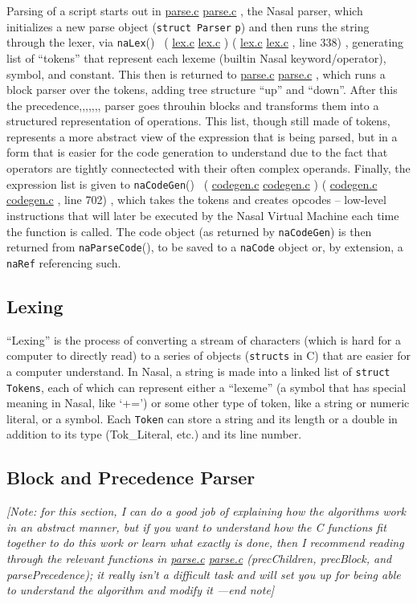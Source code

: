 \documentclass{article}
\newcommand{\todo}[1]{}
\newcommand{\type}[1]{\textcolor{type}{\tt #1}}
\newcommand{\func}[1]{\textcolor{func}{\tt #1}}
\newcommand{\nasalsourcefile}[2][]{%
  \ifthenelse{\isempty{#1}}%
    {%
      \textcolor{source}{%
        \href{https://github.com/andyross/nasal/blob/master/src/#2}{#2}%
      }%
    }%
    {%
      \textcolor{source}{%
        \href{https://github.com/andyross/nasal/blob/master/src/#2\#L#1}{#2}%
      }%
    }%
}
\newcommand{\citesourcefile}[2][]{%
  \ifthenelse{\isempty{#1}}%
    {%
      (\nasalsourcefile{#2})%
    }%
    {%
      (\nasalsourcefile[#1]{#2}, line #1)%
    }%
}
\newcommand{\Tok}[1]{\textcolor{opcode}{\sc Tok\_#1}}
\newcommand{\fp}{\textcolor{func}{()}}
\begin{document}
Parsing of a script starts out in \nasalsourcefile{parse.c}, the Nasal parser, which initializes a new parse object (\type{struct Parser} {\tt p}) and then runs the string through the lexer, via \func{naLex}\fp\ \citesourcefile[338]{lex.c}, generating list of ``tokens'' that represent each lexeme (builtin Nasal keyword/operator), symbol, and constant.  This then is returned to \nasalsourcefile{parse.c}, which runs a block parser over the tokens, adding tree structure ``up'' and ``down''.  After this the precedence,,,,,,,  parser goes throuhin blocks and transforms them into a structured representation of operations.  This list, though still made of tokens, represents a more abstract view of the expression that is being parsed, but in a form that is easier for the code generation to understand due to the fact that operators are tightly connectected with their often complex operands.  Finally, the expression list is given to \func{naCodeGen}\fp\ \citesourcefile[702]{codegen.c}, which takes the tokens and creates opcodes -- low-level instructions that will later be executed by the Nasal Virtual Machine each time the function is called.  The code object (as returned by \func{naCodeGen}) is then returned from \func{naParseCode}\fp, to be saved to a \type{naCode} object or, by extension, a \type{naRef} referencing such.

\subsection{Lexing}
\todo{maybe split this, i.e. general section on parsing, with all steps, tokenize, lexing, parse tree generation? Also, parsing can be visualized using tikz graphs with left-hand and right-hand tokens, VM stuff should be introduced after parsing probably}

``Lexing'' is the process of converting a stream of characters (which is hard for a computer to directly read) to a series of objects (\type{structs} in C) that are easier for a computer understand.  In Nasal, a string is made into a linked list of \type{struct Tokens}, each of which can represent either a ``lexeme'' (a symbol that has special meaning in Nasal, like `+=') or some other type of token, like a string or numeric literal, or a symbol.  Each \type{Token} can store a string and its length or a double in addition to its type (\Tok{Literal}, etc.) and its line number.

\subsection{Block and Precedence Parser}
\textit{[Note: for this section, I can do a good job of explaining how the algorithms work in an abstract manner, but if you want to understand how the C functions fit together to do this work or learn what exactly is done, then I recommend reading through the relevant functions in \nasalsourcefile[238]{parse.c} (\textcolor{func}{precChildren}, \textcolor{func}{precBlock}, and \textcolor{func}{parsePrecedence}); it really isn't a difficult task and will set you up for being able to understand the algorithm and modify it ---end note]}
\end{document}

